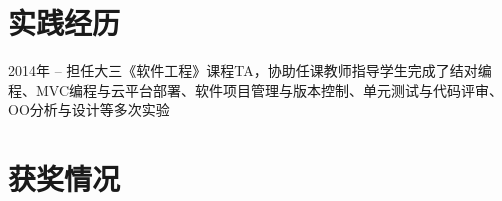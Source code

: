 \documentclass[11pt,a4paper,sans]{moderncv}   %
\begin{document}
\begin{CJK}{UTF8}{gbsn}
\section{实践经历}
2014年 -- 担任大三《软件工程》课程TA，协助任课教师指导学生完成了结对编程、MVC编程与云平台部署、软件项目管理与版本控制、单元测试与代码评审、OO分析与设计等多次实验

\section{获奖情况}

\clearpage\end{CJK}
\end{document}
